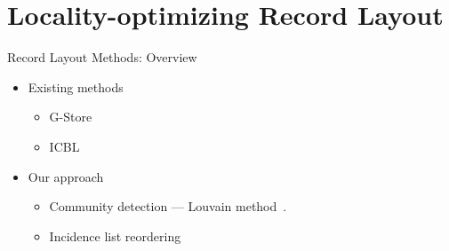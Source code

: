 \documentclass[rgb]{beamer}
\begin{document}
\section{Locality-optimizing Record Layout}
    \begin{frame}{Record Layout Methods: Overview}
        \begin{itemize}
            \item Existing methods \\ [0.5em]
            \begin{itemize}
                \item G-Store~\autocite{steinhaus2010g} \\ [0.5em]
                \item ICBL~\autocite{yacsar2017distributed} \\ [2em]
            \end{itemize}
            
            \item Our approach \\ [0.5em]
            \begin{itemize}
             \item Community detection --- Louvain method~\autocite{blondel2008fast}. \\ [0.5em]
             \item Incidence list reordering
            \end{itemize}
        \end{itemize}
    \end{frame}
\end{document}
